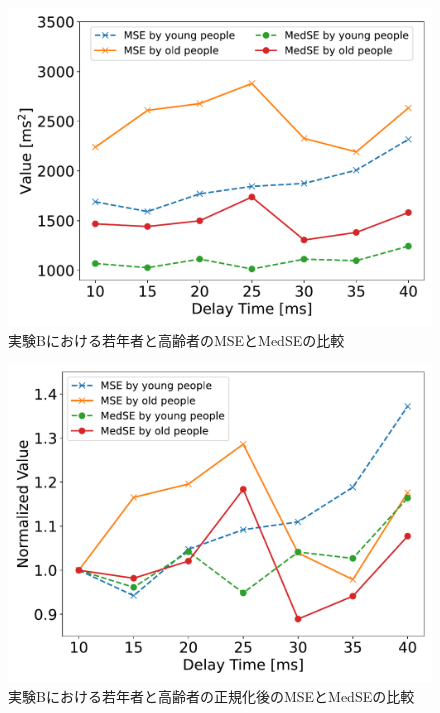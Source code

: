 \begin{figure}[tbp]
  \centering
  \includegraphics[scale=0.5]{figures/Honbann/Comparison_young_old/40_MSE-MedSE.pdf}
  \caption{実験Bにおける若年者と高齢者のMSEとMedSEの比較}
  \label{fig:40ms_MSE_MedSE}
\end{figure}

\begin{figure}[tbp]
  \centering
  \includegraphics[scale=0.5]{figures/Honbann/Comparison_young_old/40_MSE-MedSE_normalized.pdf}
  \caption{実験Bにおける若年者と高齢者の正規化後のMSEとMedSEの比較}
  \label{fig:Normalized_40ms_MSE_MedSE}
\end{figure}